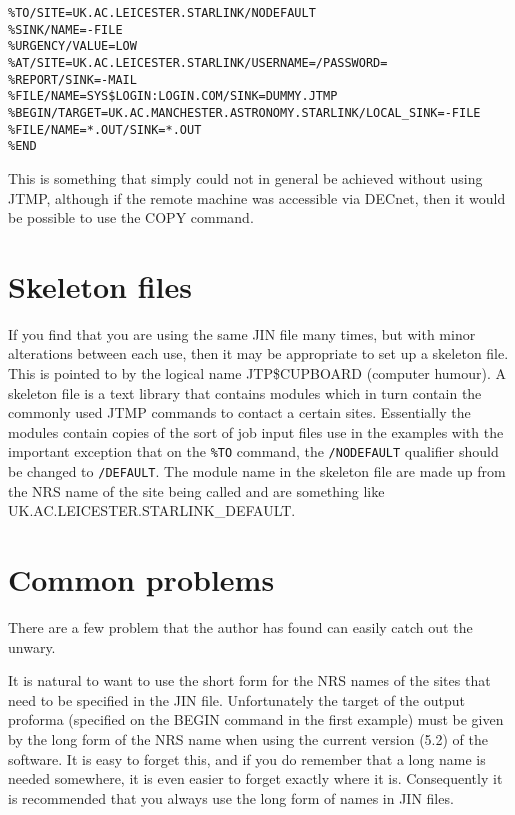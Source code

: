 \begin{verbatim}
%TO/SITE=UK.AC.LEICESTER.STARLINK/NODEFAULT
%SINK/NAME=-FILE
%URGENCY/VALUE=LOW
%AT/SITE=UK.AC.LEICESTER.STARLINK/USERNAME=/PASSWORD=
%REPORT/SINK=-MAIL
%FILE/NAME=SYS$LOGIN:LOGIN.COM/SINK=DUMMY.JTMP
%BEGIN/TARGET=UK.AC.MANCHESTER.ASTRONOMY.STARLINK/LOCAL_SINK=-FILE
%FILE/NAME=*.OUT/SINK=*.OUT
%END
\end{verbatim}

This is something that simply could not in general be achieved without using
JTMP, although if the remote machine was accessible via DECnet, then it would
be possible to use the COPY command.

\section{Skeleton files}
\label{skeletons}

If you find that you are using the same JIN file many times, but with minor
alterations between each use, then it may be appropriate to set up a skeleton
file. This is pointed to by the logical name JTP\$CUPBOARD (computer humour). A
skeleton file is a text library that contains modules which in turn contain the
commonly used JTMP commands to contact a certain sites. Essentially the modules
contain copies of the sort of job input files use in the examples with the
important exception that on the {\tt \%TO} command, the {\tt /NODEFAULT}
qualifier should be changed to {\tt /DEFAULT}. The module name in the skeleton
file are made up from the NRS name of the site being called and are something
like UK.AC.\-LEICESTER.\-STARLINK\_DEFAULT.

\section{Common problems}

There are a few problem that the author has found can easily catch out the
unwary. 

It is natural to want to use the short form for the NRS names of the sites that
need to be specified in the JIN file. Unfortunately the target of the output
proforma (specified on the BEGIN command in the first example) must be given by
the long form of the NRS name when using the current version (5.2) of the
software. It is easy to forget this, and if you do remember that a long name is
needed somewhere, it is even easier to forget exactly where it is. Consequently 
it is recommended that you always use the long form of names in JIN files.

